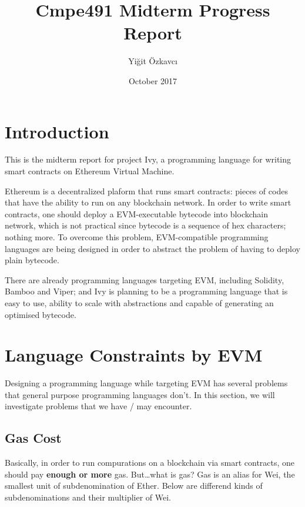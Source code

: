 \documentclass{article}
\title{Cmpe491 Midterm Progress Report}
\author{Yiğit Özkavcı}
\date{October 2017}
\begin{document}
\maketitle

\tableofcontents

\newpage

\section{Introduction}
\par 
\par This is the midterm report for project Ivy, a programming language for writing smart contracts on Ethereum Virtual Machine.
\par Ethereum is a decentralized plaform that runs smart contracts: pieces of codes that have the ability to run on any blockchain network. In order to write smart contracts, one should deploy a EVM-executable bytecode into blockchain network, which is not practical since bytecode is a sequence of hex characters; nothing more. To overcome this problem, EVM-compatible programming languages are being designed in order to abstract the problem of having to deploy plain bytecode. 
\par There are already programming languages targeting EVM, including Solidity\cite{solidity}, Bamboo\cite{bamboo} and Viper\cite{viper}; and Ivy is planning to be a programming language that is easy to use, ability to scale with abstractions and capable of generating an optimised bytecode.

\section{Language Constraints by EVM}
Designing a programming language while targeting EVM has several problems that general purpose programming languages don't. In this section, we will investigate problems that we have / may encounter.

\subsection{Gas Cost}
\par Basically, in order to run compurations on a blockchain via smart contracts, one should pay \textbf{enough or more} gas. But\ldots what is gas? Gas is an alias for Wei, the smallest unit of subdenomination of Ether. Below are differend kinds of subdenominations and their multiplier of Wei.
\end{document}
